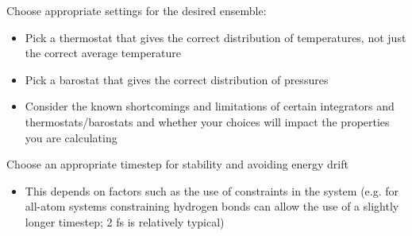 \documentclass[9pt,bestpractices]{livecoms}
\begin{document}
\begin{Checklists*}[p!]
\begin{checklist}{Choose appropriate settings for the desired ensemble:}
\begin{itemize}
\item Pick a thermostat that gives the correct distribution of temperatures, not just the correct average temperature
\item Pick a barostat that gives the correct distribution of pressures
\item Consider the known shortcomings and limitations of certain integrators and thermostats/barostats and whether your choices will impact the properties you are calculating
\end{itemize}
\end{checklist}


\begin{checklist}{Choose an appropriate timestep for stability and avoiding energy drift}
\begin{itemize}
\item This depends on factors such as the use of constraints in the system (e.g. for all-atom systems constraining hydrogen bonds can allow the use of a slightly longer timestep; 2 fs is relatively typical)
\end{itemize}
\end{checklist}


\end{Checklists*}







\nocite{*}
{}
\end{document}
